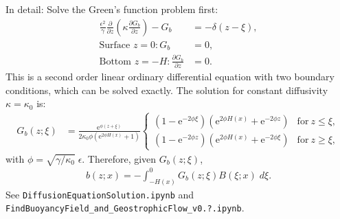 \documentclass[10pt]{amsart}
\begin{document}
In detail: Solve the Green's function problem first:
\begin{align}
\frac{\epsilon^2}{\gamma} \frac{\partial }{\partial z} \left( \kappa \frac{\partial G_b}{\partial z} \right) -  G_b & =  -  \delta(z - \xi) , \label{eqn:Gsfn}\\
\text{Surface~}z = 0:
G_b &= 0 ,
\label{eqn:Gsfn_sfcbc} \\
\text{Bottom~}z = -H:
\frac{\partial G_b}{\partial z} &= 0 .
\label{eqn:Gsfn_botbc}
\end{align}
This is a second order linear ordinary differential equation with two boundary conditions, which can be solved exactly.
The solution for constant diffusivity $\kappa = \kappa_0$ is:
\begin{align}
G_b (z; \xi) & = \frac{\mathrm{e}^{\phi \left(z + \xi\right)}}
{2  \kappa_0 \phi \left(\mathrm{e}^{2 \phi H \left(x \right)} + 1\right)}
\begin{cases} 
\displaystyle \left(1 - \mathrm{e}^{- 2 \phi \xi} \right) \left(\mathrm{e}^{2 \phi H{\left(x \right)}} + \mathrm{e}^{- 2 \phi z  }\right) & \text{for}\: z \leq \xi , \\
\displaystyle \left(1 - \mathrm{e}^{- 2 \phi   z} \right) \left(\mathrm{e}^{2 \phi H{\left(x \right)}} + \mathrm{e}^{- 2 \phi \xi}\right) & \text{for}\: z \geq \xi ,
\end{cases}
\end{align}
with $\phi = \sqrt{\gamma/\kappa_0} \; \epsilon$.
Therefore, given $G_b(z; \xi)$,
\begin{align}
b(z; x) = - \int_{-H(x)}^{0} G_b(z; \xi) B(\xi; x) \; d \xi  .
\end{align}
See \texttt{DiffusionEquationSolution.ipynb} and \texttt{FindBuoyancyField\_and\_GeostrophicFlow\_v0.?.ipynb}.
\end{document}

